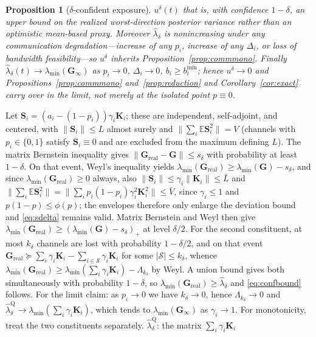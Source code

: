 \documentclass[journal]{IEEEtran}
\theoremstyle{plain}
\newtheorem{proposition}{Proposition}
\theoremstyle{definition}
\theoremstyle{remark}
\newcommand{\bG}{\mathbf{G}}
\newcommand{\lmin}{\lambda_{\min}}
\begin{document}
\begin{proposition}[$\delta$-confident exposure]
$u^{\delta}(t)$ that is, with confidence $1-\delta$, an \emph{upper} bound
on the realized worst-direction posterior variance rather than an
optimistic mean-based proxy. Moreover $\hat\lambda_{\delta}$ is
nonincreasing under any communication degradation---increase of any $p_i$,
increase of any $\Delta_i$, or loss of bandwidth feasibility---so
$u^{\delta}$ inherits Proposition~\ref{prop:commmono}. Finally
$\hat\lambda_{\delta}(t)\to\lmin(\bG_{\infty})$ as $p_i\to0$, $\Delta_i\to0$,
$b_i\ge b_i^{\min}$; hence $u^{\delta}\to0$ and
Propositions~\ref{prop:commmono} and~\ref{prop:reduction} and
Corollary~\ref{cor:exact} carry over \emph{in the limit}, not merely at
the isolated point $p\equiv0$.
\end{proposition}
\begin{IEEEproof}
Let $\mathbf{S}_i=(a_i-(1-p_i))\gamma_i\mathbf{K}_i$; these are
independent, self-adjoint, and centered, with
$\|\mathbf{S}_i\|\le L$ almost surely and
$\|\sum_i\mathbb{E}\mathbf{S}_i^{2}\|=V$ (channels with
$p_i\in\{0,1\}$ satisfy $\mathbf{S}_i\equiv0$ and are excluded from the
maximum defining $L$). The matrix Bernstein inequality gives
$\|\bG_{\mathrm{real}}-\bG\|\le s_{\delta}$ with probability at least
$1-\delta$. On that event, Weyl's inequality yields
$\lmin(\bG_{\mathrm{real}})\ge\lmin(\bG)-s_{\delta}$, and since
$\lmin(\bG_{\mathrm{real}})\ge0$ always, also
$\|\mathbf{S}_i\|\le\gamma_i\|\mathbf{K}_i\|\le\bar L$ and
$\|\sum_i\mathbb{E}\mathbf{S}_i^{2}\|
=\|\sum_i p_i(1-p_i)\gamma_i^{2}\mathbf{K}_i^{2}\|\le\bar V$, since
$\gamma_i\le1$ and $p(1-p)\le\phi(p)$; the envelopes therefore only
enlarge the deviation bound and \eqref{eq:sdelta} remains valid. Matrix
Bernstein and Weyl then give
$\lmin(\bG_{\mathrm{real}})\ge(\lmin(\bG)-s_{\delta})_{+}$ at level
$\delta/2$. For the second constituent, at most $k_{\delta}$ channels are
lost with probability $1-\delta/2$, and on that event
$\bG_{\mathrm{real}}\succeq\sum_i\gamma_i\mathbf{K}_i-\sum_{i\in\mathcal{S}}\gamma_i\mathbf{K}_i$
for some $|\mathcal{S}|\le k_{\delta}$, whence
$\lmin(\bG_{\mathrm{real}})\ge\lmin(\sum_i\gamma_i\mathbf{K}_i)-\Lambda_{k_\delta}$
by Weyl. A union bound gives both simultaneously with probability
$1-\delta$, so $\lmin(\bG_{\mathrm{real}})\ge\hat\lambda_{\delta}$ and
\eqref{eq:confbound} follows. For the limit claim: as $p_i\to0$ we have
$k_{\delta}\to0$, hence $\Lambda_{k_\delta}\to0$ and
$\hat\lambda^{\mathrm{Q}}_{\delta}\to\lmin(\sum_i\gamma_i\mathbf{K}_i)$,
which tends to $\lmin(\bG_{\infty})$ as $\gamma_i\to1$. For monotonicity, treat the two constituents separately.
$\hat\lambda^{\mathrm{Q}}_{\delta}$: the matrix $\sum_i\gamma_i\mathbf{K}_i$

\end{IEEEproof}
\end{document}
